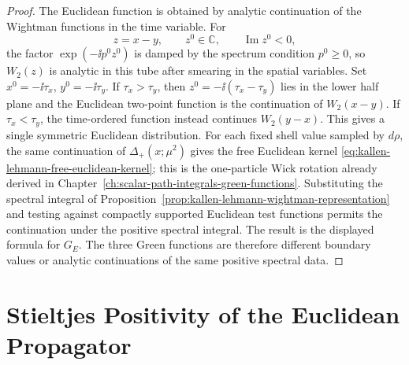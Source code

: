 \begin{proof}
The Euclidean function is obtained by analytic continuation of the Wightman
functions in the time variable.  For
\[
  z=x-y,\qquad z^0\in\mathbb C,\qquad \operatorname{Im}z^0<0,
\]
the factor
\(\exp(-\ii p^0z^0)\) is damped by the spectrum condition \(p^0\ge0\), so
\(W_2(z)\) is analytic in this tube after smearing in the spatial variables.
Set \(x^0=-\ii\tau_x\), \(y^0=-\ii\tau_y\). If
\(\tau_x>\tau_y\), then \(z^0=-\ii(\tau_x-\tau_y)\) lies in the lower half
plane and the Euclidean two-point function is the continuation of
\(W_2(x-y)\). If \(\tau_x<\tau_y\), the time-ordered function instead continues
\(W_2(y-x)\). This gives a single symmetric Euclidean distribution.
For each fixed shell value sampled by \(d\rho\), the same continuation of
\(\Delta_+(x;\mu^2)\) gives the free Euclidean kernel
\eqref{eq:kallen-lehmann-free-euclidean-kernel}; this is the one-particle
Wick rotation already derived in
Chapter~\ref{ch:scalar-path-integrals-green-functions}.  Substituting
the spectral integral of
Proposition~\ref{prop:kallen-lehmann-wightman-representation} and testing
against compactly supported Euclidean test functions permits the continuation
under the positive spectral integral.  The result is the displayed formula for
\(G_E\).  The three Green functions are therefore different boundary values or
analytic continuations of the same positive spectral data.
\end{proof}

\section{Stieltjes Positivity of the Euclidean Propagator}

